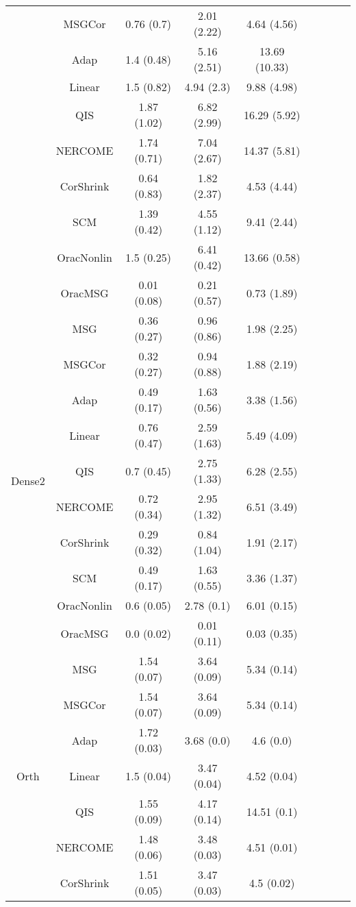 \documentclass[useAMS,referee,usenatbib]{biom}
\begin{document}
\begin{table}[H]
{\begin{tabular}{ccccccccc}
 & MSGCor   & 0.76 (0.7)  & 2.01 (2.22) & 4.64 (4.56)   \\
 & Adap     & 1.4 (0.48)  & 5.16 (2.51) & 13.69 (10.33) \\
 & Linear         & 1.5 (0.82)  & 4.94 (2.3)  & 9.88 (4.98)   \\
 & QIS            & 1.87 (1.02) & 6.82 (2.99) & 16.29 (5.92)  \\
 & NERCOME        & 1.74 (0.71) & 7.04 (2.67) & 14.37 (5.81)  \\
 & CorShrink      & 0.64 (0.83) & 1.82 (2.37) & 4.53 (4.44)   \\
 & SCM            & 1.39 (0.42) & 4.55 (1.12) & 9.41 (2.44)   \\
 & OracNonlin & 1.5 (0.25)  & 6.41 (0.42) & 13.66 (0.58)  \\
 & OracMSG  & 0.01 (0.08) & 0.21 (0.57) & 0.73 (1.89) \\ \midrule
\multirow{10}{*}{Dense2}  
 & MSG & 0.36 (0.27) & 0.96 (0.86) & 1.98 (2.25) \\
 & MSGCor   & 0.32 (0.27) & 0.94 (0.88) & 1.88 (2.19) \\
 & Adap     & 0.49 (0.17) & 1.63 (0.56) & 3.38 (1.56) \\
 & Linear         & 0.76 (0.47) & 2.59 (1.63) & 5.49 (4.09) \\
 & QIS            & 0.7 (0.45)  & 2.75 (1.33) & 6.28 (2.55) \\
 & NERCOME        & 0.72 (0.34) & 2.95 (1.32) & 6.51 (3.49) \\
 & CorShrink      & 0.29 (0.32) & 0.84 (1.04) & 1.91 (2.17) \\
 & SCM            & 0.49 (0.17) & 1.63 (0.55) & 3.36 (1.37) \\
 & OracNonlin & 0.6 (0.05)  & 2.78 (0.1)  & 6.01 (0.15) \\
 & OracMSG  & 0.0 (0.02)  & 0.01 (0.11) & 0.03 (0.35) \\ \midrule
\multirow{10}{*}{Orth}  
 & MSG & 1.54 (0.07) & 3.64 (0.09) & 5.34 (0.14)  \\
 & MSGCor   & 1.54 (0.07) & 3.64 (0.09) & 5.34 (0.14)  \\
 & Adap     & 1.72 (0.03) & 3.68 (0.0)  & 4.6 (0.0)    \\
 & Linear         & 1.5 (0.04)  & 3.47 (0.04) & 4.52 (0.04)  \\
 & QIS            & 1.55 (0.09) & 4.17 (0.14) & 14.51 (0.1)  \\
 & NERCOME        & 1.48 (0.06) & 3.48 (0.03) & 4.51 (0.01)  \\
 & CorShrink      & 1.51 (0.05) & 3.47 (0.03) & 4.5 (0.02)   \\

\end{tabular}}
\end{table}
\end{document}
